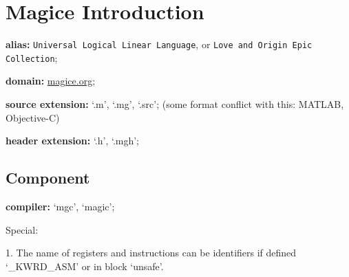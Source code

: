 \documentclass[UTF8]{book}
\begin{document}
	\author{dosconio}
	\section{Magice Introduction}
	
	\textbf{alias:} \texttt{Universal Logical Linear Language}, or
		\texttt{Love and Origin Epic Collection};
	
	\textbf{domain:} \href{http://magice.org}{magice.org};
	
	\textbf{source extension:} `.m', `.mg', `.src'; (some format conflict with this: MATLAB, Objective-C)
	
	\textbf{header extension:} `.h', `.mgh';
	
		\subsection{Component}
		
		\textbf{compiler:} `mgc', `magic';

	Special:

	1. The name of registers and instructions can be identifiers if defined `_KWRD_ASM' or in block `unsafe'.
\end{document}
